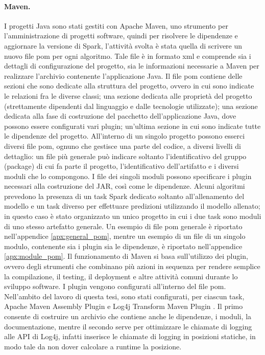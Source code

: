 \documentclass[12pt,a4paper,fleqn,titlepage]{report}
\begin{document}
        \paragraph{Maven.}
        I progetti Java sono stati gestiti con Apache Maven, uno strumento per l'amministrazione di progetti software, quindi per risolvere le dipendenze e aggiornare la versione di Spark, l'attività svolta è stata quella di scrivere un nuovo file \gls{pom} per ogni algoritmo. Tale file è in formato \gls{xml} e comprende sia i dettagli di configurazione del progetto, sia le informazioni necessarie a Maven per realizzare l'archivio contenente l'applicazione Java. Il file \gls{pom} contiene delle sezioni che sono dedicate alla struttura del progetto, ovvero in cui sono indicate le relazioni fra le diverse classi; una sezione dedicata alle proprietà del progetto (strettamente dipendenti dal linguaggio e dalle tecnologie utilizzate); una sezione dedicata alla fase di costruzione del pacchetto dell'applicazione Java, dove possono essere configurati vari plugin; un'ultima sezione in cui sono indicate tutte le dipendenze del progetto.
        All'interno di un singolo progetto possono esserci diversi file \gls{pom}, ognuno che gestisce una parte del codice, a diversi livelli di dettaglio: un file più generale può indicare soltanto l'identificativo del gruppo (package) di cui fa parte il progetto, l'identificativo dell'artifatto e i diversi moduli che lo compongono. I file dei singoli moduli possono specificare i plugin necessari alla costruzione del JAR, così come le dipendenze. Alcuni algoritmi prevedono la presenza di un task Spark dedicato soltanto all'allenamento del modello e un task diverso per effettuare predizioni utilizzando il modello allenato; in questo caso è stato organizzato un unico progetto in cui i due task sono moduli di uno stesso artefatto generale. Un esempio di file \gls{pom} generale è riportato nell'appendice \ref{apx:general_pom}, mentre un esempio di un file di un singolo modulo, contenente sia i plugin sia le dipendenze, è riportato nell'appendice \ref{apx:module_pom}.
        Il funzionamento di Maven si basa sull'utilizzo dei plugin, ovvero degli strumenti che combinano più azioni in sequenza per rendere semplice la compilazione, il testing, il deployment e altre attività comuni durante lo sviluppo software. I plugin vengono configurati all'interno del file \gls{pom}. Nell'ambito del lavoro di questa tesi, sono stati configurati, per ciascun task, Apache Maven Assembly Plugin \cite{assembly:2024} e Log4j Transform Maven Plugin \cite{logging:2023}. Il primo consente di costruire un archivio che contiene anche le dipendenze, i moduli, la documentazione, mentre il secondo serve per ottimizzare le chiamate di logging alle API di Log4j, infatti inserisce le chiamate di logging in posizioni statiche, in modo tale da non dover calcolare a runtime la posizione.
\end{document}
